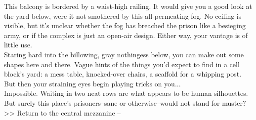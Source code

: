 This balcony is bordered by a waist-high railing. It would give you a good look at the yard below, were it not smothered by this all-permeating fog. No ceiling is visible, but it’s unclear whether the fog has breached the prison like a besieging army, or if the complex is just an open-air design. Either way, your vantage is of little use.\\

Staring hard into the billowing, gray nothingess below, you can make out some shapes here and there. Vague hints of the things you’d expect to find in a cell block’s yard: a mess table, knocked-over chairs, a scaffold for a whipping post. But then your straining eyes begin playing tricks on you...\\

Impossible. Waiting in two neat rows are what appears to be human silhouettes. But surely this place’s prisoners--sane or otherwise--would not stand for muster?\\

>> Return to the central mezzanine -- 